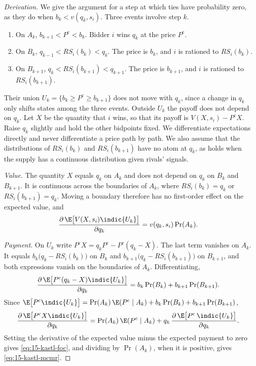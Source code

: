 \begin{proof}[Derivation]
We give the argument for a step at which ties have probability zero, as they do when $b_k<v(q_k,s_i)$. Three
events involve step $k$.
\begin{enumerate}[label=(\roman*)]
\item On $A_k$, $b_{k+1}<P^{\mathrm c}<b_k$. Bidder $i$ wins $q_k$ at the price $P^{\mathrm c}$.
\item On $B_k$, $q_{k-1}<RS_i(b_k)<q_k$. The price is $b_k$, and $i$ is rationed to $RS_i(b_k)$.
\item On $B_{k+1}$, $q_k<RS_i(b_{k+1})<q_{k+1}$. The price is $b_{k+1}$, and $i$ is rationed to
$RS_i(b_{k+1})$.
\end{enumerate}
Their union $U_k=\{b_k\ge P^{\mathrm c}\ge b_{k+1}\}$ does not move with $q_k$, since a change in $q_k$ only shifts
states among the three events. Outside $U_k$ the payoff does not depend on $q_k$. Let $X$ be the quantity that $i$
wins, so that its payoff is $V(X,s_i)-P^{\mathrm c}X$. Raise $q_k$ slightly and hold the other bidpoints fixed. We
differentiate expectations directly and never differentiate a price path by path. We also assume that the
distributions of $RS_i(b_k)$ and $RS_i(b_{k+1})$ have no atom at $q_k$, as holds when the supply has a continuous
distribution given rivals' signals.

\emph{Value.} The quantity $X$ equals $q_k$ on $A_k$ and does not depend on $q_k$ on $B_k$ and $B_{k+1}$. It is
continuous across the boundaries of $A_k$, where $RS_i(b_k)=q_k$ or $RS_i(b_{k+1})=q_k$. Moving a boundary
therefore has no first-order effect on the expected value, and
\[
\frac{\partial\,\E\bigl[V(X,s_i)\indic\{U_k\}\bigr]}{\partial q_k}=v(q_k,s_i)\Pr(A_k).
\]

\emph{Payment.} On $U_k$ write $P^{\mathrm c}X=q_kP^{\mathrm c}-P^{\mathrm c}(q_k-X)$. The last term vanishes on
$A_k$. It equals $b_k\big(q_k-RS_i(b_k)\big)$ on $B_k$ and $b_{k+1}\big(q_k-RS_i(b_{k+1})\big)$ on $B_{k+1}$, and both
expressions vanish on the boundaries of $A_k$. Differentiating,
\[
\frac{\partial\,\E\bigl[P^{\mathrm c}(q_k-X)\indic\{U_k\}\bigr]}{\partial q_k}=b_k\Pr(B_k)+b_{k+1}\Pr(B_{k+1}).
\]
Since $\E\bigl[P^{\mathrm c}\indic\{U_k\}\bigr]=\Pr(A_k)\,\E(P^{\mathrm c}\mid A_k)+b_k\Pr(B_k)+b_{k+1}\Pr(B_{k+1})$,
\[
\frac{\partial\,\E\bigl[P^{\mathrm c}X\indic\{U_k\}\bigr]}{\partial q_k}
=\Pr(A_k)\,\E(P^{\mathrm c}\mid A_k)+q_k\,\frac{\partial\,\E\bigl[P^{\mathrm c}\,\indic\{U_k\}\bigr]}{\partial q_k}.
\]
Setting the derivative of the expected value minus the expected payment to zero gives \eqref{eq:15-kastl-foc}, and
dividing by $\Pr(A_k)$, when it is positive, gives \eqref{eq:15-kastl-mcmr}.


\end{proof}
